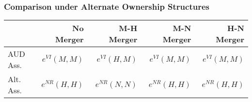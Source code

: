 \documentclass[aspectratio=169]{beamer}
\begin{document}
\begin{frame}
\frametitle{Comparison under Alternate Ownership Structures}
\begin{table}[htbp]
  \begin{center}
  \label{tab:merger}
    \begin{tabular}{|l | rrrr|}
\hline
          & No Merger & M-H Merger & M-N Merger & H-N Merger \\
\hline
     AUD Ass. & $e^{VI}(M,M)$ & $e^{VI}(H,M)$ & $e^{VI}(M,M)$ & $e^{VI}(M,M)$ \\
    Alt. Ass. & $e^{NR}(H,H)$ &  $e^{NR}(N,N)$ &  $e^{NR}(H,H)$ &  $e^{NR}(H,H)$ \\
    \hline
 

\end{tabular}
\end{center}
\end{table}
\end{frame}
\end{document}
